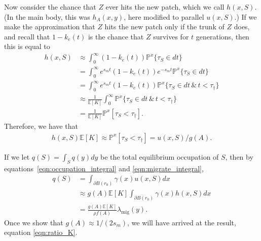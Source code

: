 \documentclass{article}
\renewcommand{\P}{\mathbb{P}}
\newcommand{\E}{\mathbb{E}}
\newcommand{\migrate}{\lambda_\text{mig}}
\begin{document}
Now consider the chance that $Z$ ever hits the new patch, which we call $h(x,S)$.
(In the main body, this was $h_A(x,y)$, here modified to parallel $u(x,S)$.)
If we make the approximation that $Z$ hits the new patch only if the trunk of $Z$ does,
and recall that $1-k_e(t)$ is the chance that $Z$ survives for $t$ generations,
then this is equal to
\begin{align}
    h(x,S) &\approx \int_0^\infty (1-k_e(t)) \P^x\{ \tau_S \in dt \} \\
           &= \int_0^\infty e^{s_m t} (1-k_e(t)) e^{- s_m t } \P^x\{ \tau_S \in dt \} \\
           &=\int_0^\infty e^{s_m t} (1-k_e(t)) \P^x\{ \tau_S \in dt \, \& \, t < \tau_\dagger \} \\
           &\approx \frac{1}{\E[K]} \int_0^\infty \P^x\{ \tau_S \in dt \, \& \, t < \tau_\dagger \} \\
    &= \frac{1}{\E[K]} \P^x[ \tau_S < \tau_\dagger ] .
\end{align}
Therefore, we have that
\begin{align} \label{eqn:boils_downto}
    h(x,S) \E[K] 
    \approx \P^x[ \tau_S < \tau_\dagger ] 
    = u(x,S) / g(A) .
\end{align}

If we let $q(S) = \int_S q(y) dy$ be the total equilibrium occupation of $S$,
then by equations~\eqref{eqn:occupation_integral} and \eqref{eqn:migrate_integral},
\begin{align}
    q(S)  &= \int_{\partial B(r_0)} \gamma(x) u(x,S) dx  \\
          &\approx g(A) \E[K] \int_{\partial B(r_0)} \gamma(x) h(x,S) dx \\
          &= \frac{ g(A) \E[K] }{ \rho f(A) } \migrate(y) . \label{eqn:q_migrate_relation}
\end{align}
Once we show that $g(A) \approx 1/(2 s_m)$, 
we will have arrived at the result, equation \eqref{eqn:ratio_K}.
\end{document}
